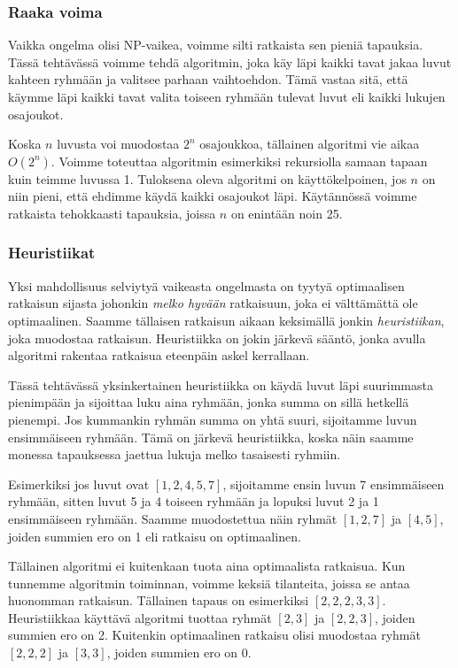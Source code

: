 \subsubsection{Raaka voima}

Vaikka ongelma olisi NP-vaikea, voimme silti ratkaista sen
pieniä tapauksia.
Tässä tehtävässä voimme tehdä algoritmin,
joka käy läpi kaikki tavat jakaa luvut kahteen ryhmään
ja valitsee parhaan vaihtoehdon.
Tämä vastaa sitä, että käymme läpi kaikki tavat valita
toiseen ryhmään tulevat luvut
eli kaikki lukujen osajoukot.

Koska $n$ luvusta voi muodostaa $2^n$ osajoukkoa,
tällainen algoritmi vie aikaa $O(2^n)$.
Voimme toteuttaa algoritmin esimerkiksi rekursiolla
samaan tapaan kuin teimme luvussa 1.
Tuloksena oleva algoritmi on käyttökelpoinen, jos $n$ on niin pieni,
että ehdimme käydä kaikki osajoukot läpi.
Käytännössä voimme ratkaista tehokkaasti tapauksia,
joissa $n$ on enintään noin 25.

\subsubsection{Heuristiikat}


Yksi mahdollisuus selviytyä vaikeasta ongelmasta on tyytyä
optimaalisen ratkaisun sijasta johonkin \emph{melko hyvään} ratkaisuun,
joka ei välttämättä ole optimaalinen.
Saamme tällaisen ratkaisun aikaan keksimällä jonkin
\emph{heuristiikan}, joka muodostaa ratkaisun.
Heuristiikka on jokin järkevä sääntö, jonka avulla
algoritmi rakentaa ratkaisua eteenpäin askel kerrallaan.

Tässä tehtävässä yksinkertainen heuristiikka on
käydä luvut läpi suurimmasta pienimpään ja sijoittaa
luku aina ryhmään, jonka summa on sillä hetkellä pienempi.
Jos kummankin ryhmän summa on yhtä suuri,
sijoitamme luvun ensimmäiseen ryhmään.
Tämä on järkevä heuristiikka, koska näin saamme monessa tapauksessa
jaettua lukuja melko tasaisesti ryhmiin.

Esimerkiksi jos luvut ovat $[1,2,4,5,7]$, sijoitamme ensin
luvun 7 ensim\-mäiseen ryhmään, sitten luvut 5 ja 4 toiseen ryhmään
ja lopuksi luvut 2 ja 1 ensimmäiseen ryhmään.
Saamme muodostettua näin ryhmät $[1,2,7]$ ja $[4,5]$,
joiden summien ero on 1 eli ratkaisu on optimaalinen.

Tällainen algoritmi ei kuitenkaan tuota aina optimaalista ratkaisua.
Kun tunnemme algoritmin toiminnan, voimme keksiä tilanteita,
joissa se antaa huonomman ratkaisun.
Tällainen tapaus on esimerkiksi $[2,2,2,3,3]$.
Heuristiikkaa käyttävä algoritmi tuottaa ryhmät $[2,3]$ ja $[2,2,3]$,
joiden summien ero on 2.
Kuitenkin optimaalinen ratkaisu olisi muodostaa ryhmät
$[2,2,2]$ ja $[3,3]$, joiden summien ero on 0.

